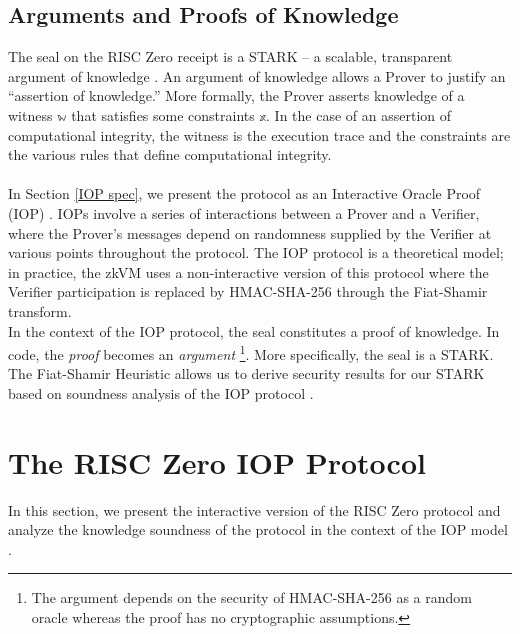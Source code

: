 \documentclass[10pt,letterpaper,titlepage]{article}
\theoremstyle{definition}
\begin{document}
\subsection{Arguments and Proofs of Knowledge} 
\label{arguments}
The seal on the RISC Zero receipt is a STARK -- a scalable, transparent argument of knowledge \cite{stark}. 
An argument of knowledge allows a Prover to justify an ``assertion of knowledge.'' 
More formally, the Prover asserts knowledge of a witness $\mathbb{w}$ that satisfies some constraints $\mathbb{x}$. 
In the case of an assertion of computational integrity, the witness is the execution trace and the constraints are the various rules that define computational integrity. \\
\\
In Section \ref{IOP spec}, we present the protocol as an Interactive Oracle Proof (IOP) \cite{iop}.  
IOPs involve a series of interactions between a Prover and a Verifier, where the Prover's messages depend on randomness supplied by the Verifier at various points throughout the protocol. 
The IOP protocol is a theoretical model; in practice, the zkVM uses a non-interactive version of this protocol where the Verifier participation is replaced by HMAC-SHA-256 through the Fiat-Shamir transform.
\\
In the context of the IOP protocol, the seal constitutes a proof of knowledge. In code, the \textit{proof} becomes an \textit{argument}%
\footnote{The argument depends on the security of HMAC-SHA-256 as a random oracle whereas the proof has no cryptographic assumptions.}.
More specifically, the seal is a STARK. 
The Fiat-Shamir Heuristic allows us to derive security results for our STARK based on soundness analysis of the IOP protocol \cite{fiat-shamir}.

\section{The RISC Zero IOP Protocol}
\label{iop}
In this section, we present the interactive version of the RISC Zero protocol and analyze the knowledge soundness of the protocol in the context of the IOP model \cite{iop}. 
\end{document}
